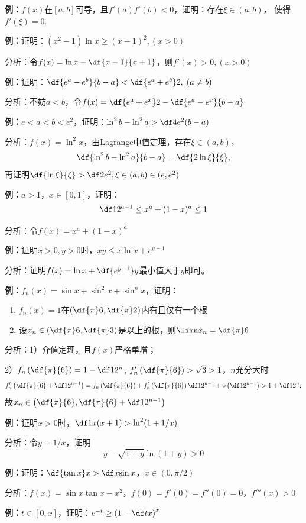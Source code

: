 {\bf 例：}$f(x)$在$[a,b]$可导，且$f'(a)f'(b)<0$，证明：存在$\xi\in(a,b)$，
使得$f'(\xi)=0$.

{\bf 例：}证明：$(x^2-1)\ln x\geq(x-1)^2,(x>0)$

分析：令$f(x)=\ln x-\df{x-1}{x+1}$，则$f'(x)>0,(x>0)$

{\bf 例：}证明：$\df{e^a-e^b}{b-a}<\df{e^a+e^b}2,\;(a\ne b)$

分析：不妨$a<b$，令$f(x)=\df{e^a+e^x}2-\df{e^a-e^x}{b-a}$

{\bf 例：}$e<a<b<e^2$，证明：$\ln^2b-\ln^2a>\df4{e^2}(b-a)$

分析：$f(x)=\ln^2x$，由Lagrange中值定理，存在$\xi\in(a,b)$，
$$\df{\ln^2b-\ln^2a}{b-a}=\df{2\ln\xi}{\xi},$$
再证明$\df{\ln\xi}{\xi}>\df2{e^2},\xi\in(a,b)\in(e,e^2)$

{\bf 例：}$a>1$，$x\in[0,1]$，证明：
$$\df1{2^{a-1}}\leq x^a+(1-x)^a\leq 1$$

分析：令$f(x)=x^a+(1-x)^a$

{\bf 例：}证明$x>0,y>0$时，$xy\leq x\ln x+e^{y-1}$

分析：证明$f(x)=\ln x+\df{e^{y-1}}y$最小值大于$y$即可。

{\bf 例：}$f_n(x)=\sin x+\sin^2x+\sin^nx$，证明：
\begin{enumerate}[1)]
  \setlength{\itemindent}{1cm}
  \item $f_n(x)=1$在$\left(\df{\pi}6,\df{\pi}2\right)$内有且仅有一个根
  \item 设$x_n\in\left(\df{\pi}6,\df{\pi}3\right)$是以上的根，则$\limn x_n=\df{\pi}6$
\end{enumerate}

分析：1）介值定理，且$f(x)$严格单增；

2）$f_n\left(\df{\pi}{6}\right)=1-\df1{2^n}$,
$f'_n\left(\df{\pi}{6}\right)>\sqrt
3>1$，$n$充分大时 $$f'_n\left(\df{\pi}{6}+\df1{2^{n-1}}\right)
=f_n\left(\df{\pi}{6}\right)+f'_n\left(\df{\pi}{6}\right)\df1{2^{n-1}}
+\circ\left(\df1{2^{n-1}}\right)>1+\df1{2^n},$$
故$x_n\in\left(\df{\pi}{6},\df{\pi}{6}+\df1{2^{n-1}}\right)$

{\bf 例：}证明$x>0$时，$\df1{x(x+1)}>\ln^2(1+1/x)$

分析：令$y=1/x$，证明
$$y-\sqrt{1+y}\ln(1+y)>0$$

{\bf 例：}证明：$\df{\tan x}x>\df x{\sin x}$，$x\in(0,\pi/2)$

分析：$f(x)=\sin x\tan x-x^2$，$f(0)=f'(0)=f''(0)=0$，$f'''(x)>0$

{\bf 例：}$t\in[0,x]$，证明：$e^{-t}\geq\left(1-\df tx\right)^x$

